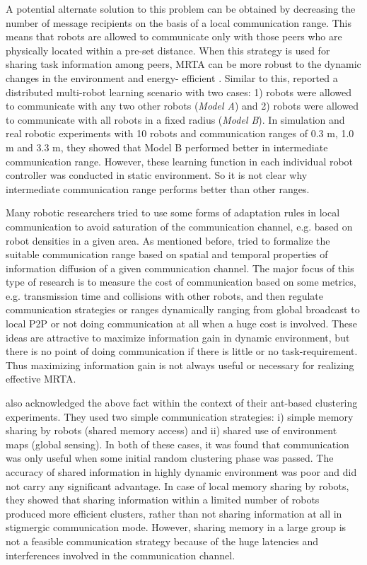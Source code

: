 A potential alternate solution to this problem can be obtained by decreasing the number of message recipients on the basis of a local communication range. This means that robots are allowed to communicate only with those peers who are physically located within a pre-set distance. When this strategy is used for sharing task information among peers, MRTA can be more robust to the dynamic changes in the environment and energy- efficient \cite{Agassounon+2002}. Similar to this,  reported a distributed multi-robot learning scenario with two cases: 1) robots were allowed to communicate with any two other robots ({\em Model A}) and 2)  robots were allowed to communicate with all robots in a fixed radius ({\em Model B}). In simulation and real robotic experiments with 10 robots and communication ranges of 0.3 m, 1.0 m and 3.3 m, they showed that Model B performed better in intermediate communication range. However, these learning function in each individual robot controller was  conducted  in static environment.  So it is not clear why intermediate communication range performs better than other ranges. 

Many robotic researchers tried to use some forms of adaptation rules in local communication to avoid saturation of the communication channel, e.g. based on robot densities in a given area.  As mentioned before,   tried to formalize the suitable communication range based on spatial and temporal properties of information diffusion of a given communication channel. The major focus of this type of research is to measure the cost of communication based on some metrics, e.g.  transmission time and collisions with other robots, and then regulate communication strategies or ranges dynamically ranging from global broadcast to local P2P or not doing communication at all when a huge cost is involved. These ideas are attractive to maximize information gain in dynamic environment, but there is no point of doing communication if there is little or no task-requirement. Thus maximizing information gain is not always useful or necessary for realizing effective MRTA.

 also acknowledged the above fact within the context of their ant-based clustering experiments. They used two simple communication strategies: i) simple memory sharing by robots (shared memory access) and ii) shared use of environment maps (global sensing). In both of these cases, it was found that communication was only useful when some initial random clustering phase was passed. The accuracy of shared information in highly dynamic environment was poor and did not carry any significant advantage. In case of local memory sharing by robots, they showed that  sharing information within a limited number of robots produced more efficient  clusters, rather than  not sharing information at all in stigmergic communication mode. However, sharing memory in a large group is not a feasible communication strategy because of the huge latencies and interferences involved in the communication channel.
